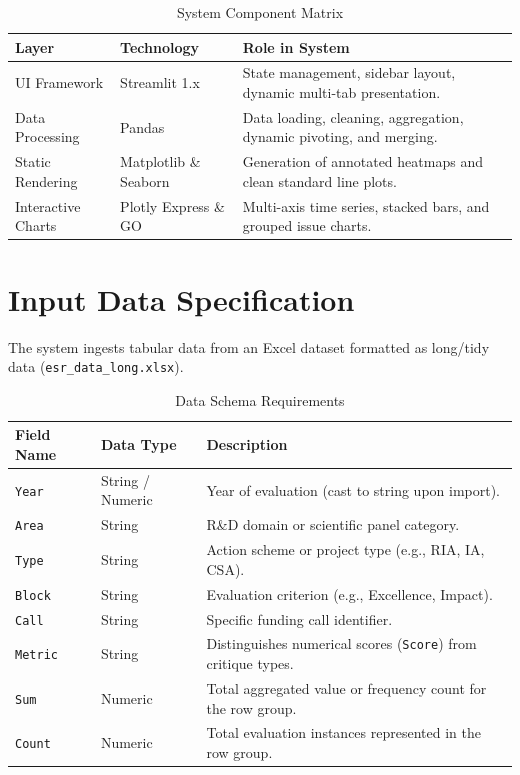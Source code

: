 \documentclass[11pt, a4paper]{article}
\begin{document}
\begin{table}[htbp]
\centering
\caption{System Component Matrix}
\vspace{0.5em}
\begin{tabular}{@{}llp{8cm}@{}}
\toprule
\textbf{Layer} & \textbf{Technology} & \textbf{Role in System} \\
\midrule
UI Framework & Streamlit 1.x & State management, sidebar layout, dynamic multi-tab presentation. \\
Data Processing & Pandas & Data loading, cleaning, aggregation, dynamic pivoting, and merging. \\
Static Rendering & Matplotlib \& Seaborn & Generation of annotated heatmaps and clean standard line plots. \\
Interactive Charts & Plotly Express \& GO & Multi-axis time series, stacked bars, and grouped issue charts. \\
\bottomrule
\end{tabular}
\end{table}

\section{Input Data Specification}

The system ingests tabular data from an Excel dataset formatted as long/tidy data (\texttt{esr\_data\_long.xlsx}). 

\begin{table}[htbp]
\centering
\caption{Data Schema Requirements}
\vspace{0.5em}
\begin{tabular}{@{}lll@{}}
\toprule
\textbf{Field Name} & \textbf{Data Type} & \textbf{Description} \\
\midrule
\texttt{Year} & String / Numeric & Year of evaluation (cast to string upon import). \\
\texttt{Area} & String & R\&D domain or scientific panel category. \\
\texttt{Type} & String & Action scheme or project type (e.g., RIA, IA, CSA). \\
\texttt{Block} & String & Evaluation criterion (e.g., Excellence, Impact). \\
\texttt{Call} & String & Specific funding call identifier. \\
\texttt{Metric} & String & Distinguishes numerical scores (\texttt{Score}) from critique types. \\
\texttt{Sum} & Numeric & Total aggregated value or frequency count for the row group. \\
\texttt{Count} & Numeric & Total evaluation instances represented in the row group. \\
\bottomrule
\end{tabular}
\end{table}
\end{document}
